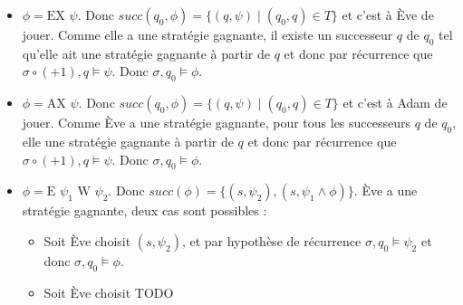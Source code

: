 \documentclass[10pt,a4paper]{article}
\begin{document}
\begin{itemize}
\item $\phi = \mbox{EX } \psi$. Donc $succ(q_0, \phi) = \{ (q, \psi) \mid (q_0,q) \in T \} $ et c'est à Ève de jouer. Comme elle a une stratégie gagnante, il existe un successeur $q$ de $q_0$ tel qu'elle ait une stratégie gagnante à partir de $q$ et donc par récurrence que $\sigma \circ (+ 1), q \vDash \psi$. Donc $\sigma, q_0 \vDash \phi$.

\item $\phi = \mbox{AX } \psi$. Donc $succ(q_0, \phi) = \{ (q, \psi) \mid (q_0,q) \in T \} $ et c'est à Adam de jouer. Comme Ève a une stratégie gagnante, pour tous les successeurs $q$ de $q_0$, elle une stratégie gagnante à partir de $q$ et donc par récurrence que $\sigma \circ (+ 1), q \vDash \psi$. Donc $\sigma, q_0 \vDash \phi$.

\item $\phi = \mbox{E } \psi_1 \mbox{ W } \psi_2$. Donc $succ(\phi) = \{ (s,\psi_2), (s, \psi_1 \land \phi) \}$. Ève a une stratégie gagnante, deux cas sont possibles :
\begin{itemize}
	\item Soit Ève choisit $(s,\psi_2)$, et par hypothèse de récurrence $\sigma, q_0 \vDash \psi_2$ et donc $\sigma, q_0 \vDash \phi$.
	\item Soit Ève choisit TODO
\end{itemize}
\end{itemize}
\end{document}
